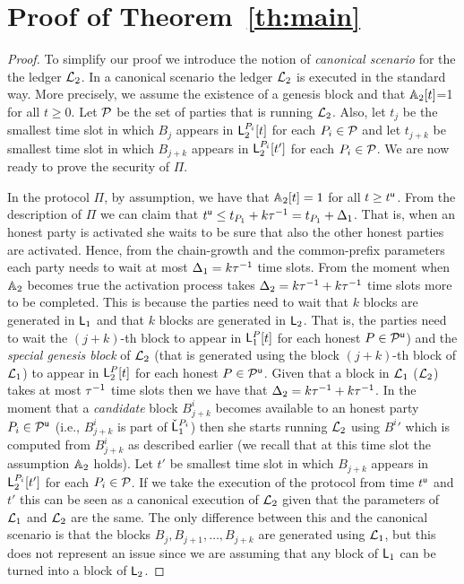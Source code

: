 \section{Proof of Theorem~\ref{th:main}}\label{se:proof}
\begin{proof}
To simplify our proof we introduce the notion of \emph{canonical scenario} for the the ledger $\mathcal{L}_2$. In a canonical scenario the ledger
$\mathcal{L}_2$ is executed in the standard way. More precisely, 
we assume the existence of a genesis block and that $\mathbb{A}_2[t]$=1 for all $t\geq 0$. Let $\mathcal{P}$ be the set of parties that is running $\mathcal{L}_2$. Also, 
let $t_j$ be the smallest time slot in which $B_j$ appears in $\mathsf{L}_2^{P_i}[t]$ for each $P_i\in\mathcal{P}$ and let $t_{j+k}$ be smallest time slot in which $B_{j+k}$ appears in 
$\mathsf{L}_2^{P_i}[t']$ for each $P_i\in\mathcal{P}$.
We are now ready to prove the security of $\Pi$.

In the protocol $\Pi$, by assumption, we have that $\mathbb{A}_2[t]=1$ for all $t\geq t^{\mathsf{u}}$. From the description of $\Pi$ we can claim that $t^{\mathsf{u}} \leq t_{P_1}+k\tau^{-1}=t_{P_1}+\Delta_1$.
That is, when an honest party is activated she waits to be sure that also the other honest parties are activated. Hence, from the chain-growth and the common-prefix parameters
each party needs to wait at most $\Delta_1=k\tau^{-1}$ time slots.
From the moment when $\mathbb{A}_2$ becomes true the activation process takes $\Delta_2=k \tau^{-1} + k \tau^{-1}$  time slots more to be completed.
This is because the parties need to wait that $k$ blocks are generated in $\mathsf{L}_1$ and that $k$ blocks are generated in $\mathsf{L}_2$. 
That is, the parties need to wait the $(j+k)$-th block to appear in $\mathsf{L}_1^P[t]$ for each honest $P\in\mathcal{P}^\mathsf{u}$) and the \emph{special genesis block} of $\mathcal{L}_2$ (that is generated using the block $(j+k)$-th block of $\mathcal{L}_1$) to appear 
in $\mathsf{L}_2^P[t]$ for each honest $P\in\mathcal{P}^\mathsf{u}$. Given that a block in $\mathcal{L}_1$ ($\mathcal{L}_2$) takes at most $\tau^{-1}$ time slots then we have that $\Delta_2=k \tau^{-1} + k \tau^{-1}$.
In the moment that a \emph{candidate} block $B^i_{j+k}$ becomes available to an honest party $P_i\in\mathcal{P}^\mathsf{u}$ (i.e., $B^i_{j+k}$ is part of $\check {\mathsf{L}}_1^{P_i}$) then she starts running $\mathcal{L}_2$
using ${B^i}'$ which is computed from $B^i_{j+k}$ as described earlier (we recall that at this time slot the assumption $\mathbb{A}_2$ holds).
Let $t'$ be smallest time slot in which $B_{j+k}$ appears in $\mathsf{L}_2^{P_i}[t']$ for each $P_i\in\mathcal{P}$.
If we take the execution of the protocol from time $t^{\mathsf{u}}$ and $t'$ this can be seen as a canonical execution of $\mathcal{L}_2$ given
that the parameters of $\mathcal{L}_1$ and $\mathcal{L}_2$ are the same. The only difference between this and the canonical scenario is
that the blocks $B_{j}, B_{j+1},\dots, B_{j+k}$ are generated using $\mathcal{L}_1$, but this does not represent an issue since we are assuming that
any block of $\mathsf{L}_1$ can be turned into a block of $\mathsf{L}_2$. \end{proof}
